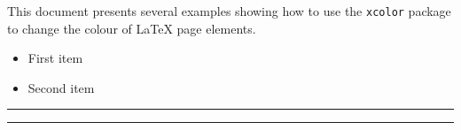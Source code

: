 \documentclass{article}
\begin{document}
\pagecolor{black}
\color{white}%
This document presents several examples showing how to use the \texttt{xcolor} package 
to change the colour of \LaTeX{} page elements.

\begin{itemize}
\item \textcolor{Mycolor1}{First item}
\item \textcolor{Mycolor2}{Second item}
\end{itemize}

\noindent
{\color{LightRubineRed} \rule{\linewidth}{1mm}}

\noindent
{\color{RubineRed} \rule{\linewidth}{1mm}}
\end{document}

